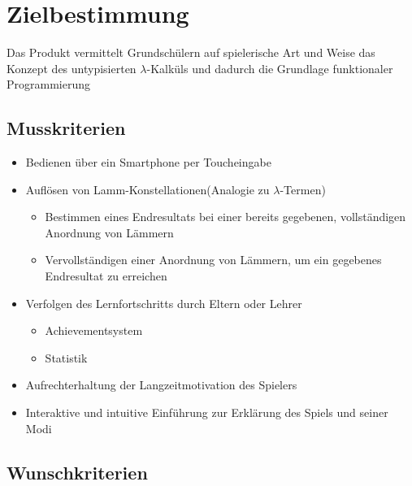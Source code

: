 \section{Zielbestimmung}

	Das Produkt vermittelt Grundschülern auf spielerische Art und Weise das Konzept des untypisierten $\lambda$-Kalküls und dadurch die Grundlage funktionaler Programmierung   			    

\subsection{Musskriterien}

\begin{itemize}
	\item Bedienen über ein Smartphone per Toucheingabe
	\item Auflösen von Lamm-Konstellationen(Analogie zu $\lambda$-Termen)
	\begin{itemize}
		\item Bestimmen eines Endresultats bei einer bereits gegebenen, vollständigen Anordnung von Lämmern 
		\item Vervollständigen einer Anordnung von Lämmern, um ein gegebenes Endresultat zu erreichen
	\end{itemize}
	\item Verfolgen des Lernfortschritts durch Eltern oder Lehrer
	\begin{itemize}
		\item Achievementsystem
		\item Statistik
	\end{itemize}
	\item Aufrechterhaltung der Langzeitmotivation des Spielers
	\item Interaktive und intuitive Einführung zur Erklärung des Spiels und seiner Modi
\end{itemize}

\subsection{Wunschkriterien}

